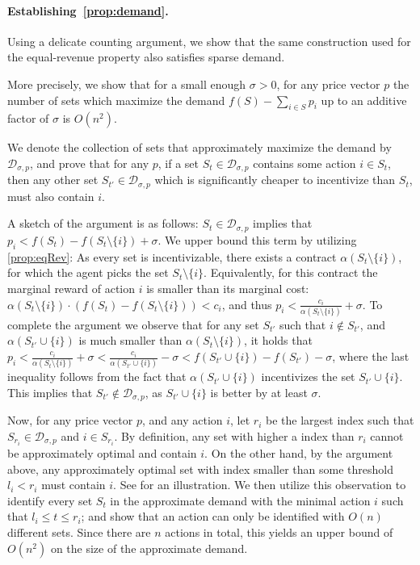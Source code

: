 \documentclass[11pt]{article}
\newcommand{\demand}[2]{\mathcal{D}_{{#1},{#2}}}
\newcommand{\demSigP}{\demand{\sigma}{p}}
\begin{document}
\paragraph{Establishing~\ref{prop:demand}.}

Using a delicate counting argument, we show that the same construction used for the equal-revenue property also satisfies sparse demand. 

More precisely, we show that for a small enough $\sigma >0$, for any price vector $p$ the number of sets which maximize the demand $f(S) - \sum_{i \in S} p_i$ up to an additive factor of $\sigma$ is $O(n^2)$.

We denote the collection of sets that approximately maximize the demand by $\demSigP$, and prove that for any $p$, if a set $S_t \in \demSigP$ contains some action $i \in S_t$, then any other set $S_{t'} \in \demSigP$ which is significantly cheaper to incentivize than $S_t$, must also contain $i$.

A sketch of the argument is as follows:
$S_t \in \demSigP$ implies that $p_i < f(S_t)-f(S_t \setminus \{i\}) + \sigma$.
We upper bound this term by utilizing
\ref{prop:eqRev}: As every set is incentivizable, there exists a contract $\alpha(S_t \setminus \{i\})$, for which the agent picks the set $S_t \setminus \{i\}$.
Equivalently, for this contract the marginal reward of action $i$ is smaller than its marginal cost: $\alpha(S_t\setminus \{i\})\cdot  (f(S_t)-f(S_t \setminus \{i\})) < c_i$, and thus $p_i < \frac{c_i}{\alpha(S_t\setminus \{i\})} + \sigma$.
To complete the argument we observe that for any set $S_{t'}$ such that $i \notin S_{t'}$, and $\alpha(S_{t'}\cup \{i\})$ is much smaller than $\alpha(S_t\setminus \{i\})$, it holds that
$p_i < \frac{c_i}{\alpha(S_t\setminus \{i\})} + \sigma
<
\frac{c_i}{\alpha(S_{t'}\cup \{i\})} - \sigma
<
f(S_{t'} \cup \{i\}) - f(S_{t'}) - \sigma
$,
where the last inequality follows from the fact that $\alpha(S_{t'}\cup \{i\})$ incentivizes the set $S_{t'} \cup \{i\}$. This implies that $S_{t'} \notin \demSigP$, as $S_{t'} \cup \{i\}$ is better by at least $\sigma$.

Now, for any price vector $p$, and any action $i$, let $r_i$ be the largest index such that $S_{r_i} \in \demSigP$ and $i \in S_{r_i}$. By definition, any set with higher a index than $r_i$ cannot be approximately optimal and contain $i$. 
On the other hand, by the argument above, any approximately optimal set with index smaller than some threshold $l_i<r_i$ must contain $i$. See  for an illustration.
We then utilize this observation to identify every set $S_t$ in the approximate demand with the minimal action $i$ such that $l_i \le t \le r_i$; and show that an action can only be identified with $O(n)$ different sets.
Since there are $n$ actions in total, this yields an upper bound of $O(n^2)$ on the size of the approximate demand.
\end{document}
